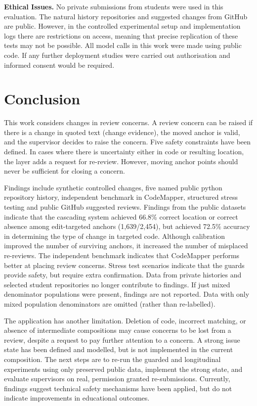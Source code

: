 \documentclass[10pt,conference,letterpaper]{IEEEtran}
\begin{document}
\textbf{Ethical Issues.} No private submissions from students were used in this evaluation. The natural history repositories and suggested changes from GitHub are public. However, in the controlled experimental setup and implementation logs there are restrictions on access, meaning that precise replication of these tests may not be possible. All model calls in this work were made using public code. If any further deployment studies were carried out authorisation and informed consent would be required.

\section{Conclusion}
This work considers changes in review concerns. A review concern can be raised if there is a change in quoted text (change evidence), the moved anchor is valid, and the supervisor decides to raise the concern. Five safety constraints have been defined. In cases where there is uncertainty either in code or resulting location, the layer adds a request for re-review. However, moving anchor points should never be sufficient for closing a concern.

Findings include synthetic controlled changes, five named public python repository history, independent benchmark in CodeMapper, structured stress testing and public GitHub suggested reviews. Findings from the public datasets indicate that the cascading system achieved 66.8\% correct location or correct absence among edit-targeted anchors (1,639/2,454), but achieved 72.5\% accuracy in determining the type of change in targeted code. Although calibration improved the number of surviving anchors, it increased the number of misplaced re-reviews. The independent benchmark indicates that CodeMapper performs better at placing review concerns. Stress test scenarios indicate that the guards provide safety, but require extra confirmation. Data from private histories and selected student repositories no longer contribute to findings. If just mixed denominator populations were present, findings are not reported. Data with only mixed population denominators are omitted (rather than re-labelled).

The application has another limitation. Deletion of code, incorrect matching, or absence of intermediate compositions may cause concerns to be lost from a review, despite a request to pay further attention to a concern. A strong issue state has been defined and modelled, but is not implemented in the current composition. The next steps are to re-run the guarded and longitudinal experiments using only preserved public data, implement the strong state, and evaluate supervisors on real, permission granted re-submissions. Currently, findings suggest technical safety mechanisms have been applied, but do not indicate improvements in educational outcomes.
\end{document}
